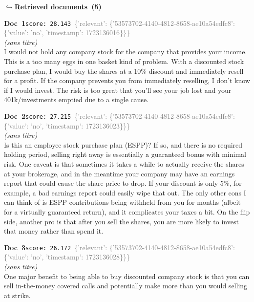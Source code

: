 \documentclass[a4paper,11pt]{article}
\begin{document}
\noindent\hfill{\footnotesize\textcolor{doccolor}{\textbf{$\hookrightarrow$\enspace Retrieved documents~(5)}}}
\begin{docenv}
{\footnotesize\textcolor{doccolor}{\textbf{Doc~1}}}\hfill{\tiny\texttt{score:~28.143}}\ {\tiny\textcolor{gray}{\{'relevant': \{'53573702-4140-4812-8658-ae10a54edfc8': \{'value': 'no', 'timestamp': 1723136016\}\}\}}}\\[3pt]
{\small\textit{(sans titre)}}\\[2pt]
\vspace{2pt}
{\footnotesize 
I would not hold any company stock for the company that provides your income.   This is a too many eggs in one basket kind of problem. With a discounted stock purchase plan, I would buy the shares at a 10\% discount and immediately resell for a profit.   If the company prevents you from immediately reselling, I  don't know if I would invest. The risk is too great that you'll see your job lost and your 401k/investments emptied due to a single cause.}
\end{docenv}
\begin{docenv}
{\footnotesize\textcolor{doccolor}{\textbf{Doc~2}}}\hfill{\tiny\texttt{score:~27.215}}\ {\tiny\textcolor{gray}{\{'relevant': \{'53573702-4140-4812-8658-ae10a54edfc8': \{'value': 'no', 'timestamp': 1723136023\}\}\}}}\\[3pt]
{\small\textit{(sans titre)}}\\[2pt]
\vspace{2pt}
{\footnotesize 
Is this an employee stock purchase plan (ESPP)? If so, and there is no required holding period, selling right away is essentially a guaranteed bonus with minimal risk. One caveat is that sometimes it takes a while to actually receive the shares at your brokerage, and in the meantime your company may have an earnings report that could cause the share price to drop. If your discount is only 5\%, for example, a bad earnings report could easily wipe that out. The only other cons I can think of is ESPP contributions being withheld from you for months (albeit for a virtually guaranteed return), and it complicates your taxes a bit. On the flip side, another pro is that after you sell the shares, you are more likely to invest that money rather than spend it.}
\end{docenv}
\begin{docenv}
{\footnotesize\textcolor{doccolor}{\textbf{Doc~3}}}\hfill{\tiny\texttt{score:~26.172}}\ {\tiny\textcolor{gray}{\{'relevant': \{'53573702-4140-4812-8658-ae10a54edfc8': \{'value': 'no', 'timestamp': 1723136028\}\}\}}}\\[3pt]
{\small\textit{(sans titre)}}\\[2pt]
\vspace{2pt}
{\footnotesize 
One major benefit to being able to buy discounted company stock is that you can sell in-the-money covered calls and potentially make more than you would selling at strike.}
\end{docenv}
\end{document}
